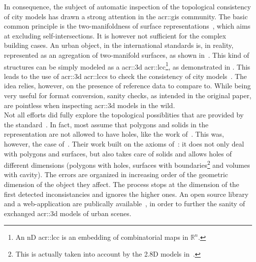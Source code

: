         In consequence, the subject of automatic inspection of the topological consistency of city models has drawn a strong attention in the \gls{acr::gis} community.
        The basic common principle is the two-manifoldness of surface representations~\parencite{groger2011achieve}, which aims at excluding self-intersections.
        It is however not sufficient for the complex building cases.
        An urban object, in the international standards is, in reality, represented as an agregation of two-manifold surfaces, as shown in~\textcite{groger2011achieve, ledoux2013validation}.
        This kind of structures can be simply modeled as a \gls{acr::3d} \gls{acr::lcc}\parencite{damiand2014combinatorial}\footnote{
            An nD \gls{acr::lcc} is an embedding of combinatorial maps in \(\mathbb{R}^n\).
        }, as demonstrated in \textcite{diakite2014topological}.
        This leads to the use of \gls{acr::3d} \glspl{acr::lcc} to check the consistency of city models~\parencite{gorszczyk2016automatic}.
        The idea relies, however, on the presence of reference data to compare to.
        While being very useful for format conversion, sanity checks, as intended in the original paper, are pointless when inspecting \gls{acr::3d} models in the wild.\\
        Not all efforts did fully explore the topological possiblities that are provided by the standard~\parencite{biljecki2016most, ledoux2013validation}.
        In fact, most assume that polygons and solids in the representation are not allowed to have holes, like the work of~\textcite{groger2011achieve, alam2014towards}.
        This was, however, the case of~\textcite{ledoux2013validation}.
        Their work built on the axioms of~\textcite{groger2011achieve}: it does not only deal with polygons and surfaces, but also takes care of solids and allows holes of different dimensions (polygons with holes, surfaces with boundaries\footnote{
            This is actually taken into account by the 2.8D models in~\textcite{groger2011achieve}.
        } and volumes with cavity).
        The errors are organized in increasing order of the geometric dimension of the object they affect.
        The process stops at the dimension of the first detected inconsistancies and ignores the higher ones. 
        An open source library and a web-application are publically available~\parencite{ledoux2018val3dity}, in order to further the sanity of exchanged \gls{acr::3d} models of urban scenes.\\


